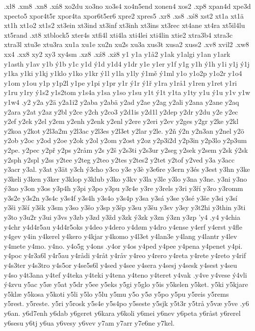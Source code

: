 {{.xł8
.xm8
.xn8
.xń8
xo2du
xo3no
xo3s4
xo4n5end
xonen4
xos2
.xp8
xpan4d
xpe3d
xpecto5
xpor4t5r
xpor4ta
xpor6t5er6
xpre2
xpres5
.xr8
.xs8
.xś8
xst2
xt1a
xt1ä
xt1h
xt1o2
xt1s2
xt3ein
xt3ind
xt3inf
xt3inh
xt3ins
xt3rec
xt4ane
xt4ra
xt5il4lu
xt5rand
.xt8
xtblock5
xter4s
xtfi4l
xti4la
xti4lei
xti4lin
xtie2
xtra3b4
xtra3c
xtra3l
xtu3e
xtu3ra
xu1a
xu1e
xu2n
xu2s
xu3a
xus3t
xusa2
xuss2
.xv8
xvil2
.xw8
xx4
.xx8
xy2
xy3
xy4sm
.xz8
.xź8
.xż8
y1
y1a
y1å2
y1ak
y1algi
y1an
y1ark
y1asth
y1av
y1b
ý1b
y1c
y1d
ý1d
y1d4
y1dr
y1e
y1er
y1f
y1g
y1h
ý1h
y1i
y1j
ý1j
y1ka
y1ki
y1kj
y1klo
y1ko
y1kr
ý1l
y1la
y1ly
ý1mě
ý1ml
y1o
y1o2p
y1o2r
y1o4
y1om
y1ou
y1p
y1p2l
y1pe
y1pi
y1pr
y1r
ý1r
ý1ř
y1ra
y1rå1
y1ren
y1ret
y1ri
y1ru
y1ry
ý1s2
y1s2tom
y1s4a
y1sa
y1so
y1su
y1t
ý1t
y1ta
y1ty
y1u
ý1u
y1v
y1w
y1w4
.y2
y2a
y2ä
y2a1i2
y2aba
y2abä
y2ad
y2ae
y2ag
y2ali
y2ana
y2ane
y2aq
y2ara
y2at
y2az
y2bl
y2ce
y2ch
y2co3
y2d1is
y2d1l
y2dep
y2dr
y2du
y2e
y2ec
y2ef
y2ek
y2el
y2em
y2enh
y2enk
y2enl
y2ere
y2eri
y2ev
y2ges
y2gr
y2ke
y2kl
y2koa
y2kot
y2l3a2m
y2l3ac
y2l3es
y2l3et
y2lar
y2le.
y2ň
ý2n
y2n3an
y2nel
y2ö
y2ob
y2oc
y2od
y2oe
y2ok
y2ol
y2om
y2ost
y2oz
y2p3i2d
y2p3in
y2p3lo
y2p3um
y2pe.
y2pec
y2př
y2ps
y2råm
y2s
y2š
y2s3ti
y2s3ur
y2seg
y2sek
y2sem
y2sk
ý2sk
y2sph
y2spl
y2ss
y2tee
y2teg
y2teo
y2tes
y2tes2
y2tet
y2tof
y2ved
y3a
y3acc
y3acr
y3al.
y3at
y3ät
y3ch
ý3cho
y3co
y3e
y3è
y3e6re
y3ern
y3és
y3est
y3hn
y3ke
y3keli
y3ken
y3ker
y3klop
y3klub
y3ko
y3kv
y3la
y3le
y3lo
y3na
y3ne.
y3ni
y3no
ý3no
y3on
y3os
y3p4h
y3pi
y3po
y3pu
y3r4e
y3re
y3rels
y3ri
y3ří
y3ro
y3romm
y3s2e
y3s2n
y3s4c
y3s4f
y3s4h
y3s4o
y3s4p
y3sa
y3sá
y3se
y3sé
y3še
y3si
y3sí
y3ši
y3ší
y3šk
y3sm
y3so
y3šo
y3sp
y3šp
y3su
y3šu
y3sv
y3sy
y3t2hi
y3thin
y3ti
y3to
y3u2r
y3ui
y3vs
y3zb
y3zd
y3žd
y3zk
ý3zk
y3zn
ý3zn
y3zp
'y4
.y4
y4chia
y4chr
y4d4r5au
y4d4r5oks
y4deo
y4dero
y4døm
y4dro
y4ense
y4erf
y4erst
y4fle
y4gev
y4in
y4kerel
y4kero
y4kjar
y4komo
y4l3et
y4lan3e
y4lang
y4lantr
y4lev
y4mete
y4mo.
y4no.
y4o5g
y4ons
.y4or
y4os
y4ped
y4pee
y4pena
y4penet
y4pi.
y4poc
y4r3a6l
y4r5au
y4rådi
y4råt
y4råv
y4reo
y4rero
y4reta
y4rete
y4reto
y4rif
y4s3ter
y4s3tro
y4s5or
y4se5s6l
y4sed
y4see
y4sera
y4sesj
y4sesk
y4sest
y4seu
y4so
y4t3ana
y4tef
y4teka
y4teki
y4tena
y4teno
y4teret
y4vak
.y4ve
y4vese
ý4vli
ý4zvu
y5ac
y5æ
y5at
y5dr
y5ee
y5eks
y5gi
y5glo
y5is
y5kelen
y5ket.
y5ki
y5kjare
y5klæ
y5kosa
y5koti
y5li
y5lo
y5lu
y5mu
y5o
y5ø
y5po
y5pu
y5reis
y5rems
y5rest.
y5reste.
y5ri
y5rosk
y5s4e
y5s4po
y5seste
y5sjk
y5t3r
y5trå
y5væ
y5ve
.y6
y6an.
y6d7enh
y6dab
y6geret
y6kara
y6koli
y6mei
y6nev
y6peta
y6råst
y6rerel
y6sesu
y6tj
y6ua
y6vesy
y6vev
y7am
y7arr
y7e6ne
y7kel.
}}
